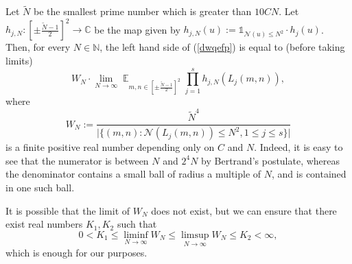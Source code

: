 \documentclass[11pt]{amsart}
\theoremstyle{definition}
\DeclareMathOperator*{\E}{\mathbb{E}}
\newcommand{\C}{{\mathbb C}}
\newcommand{\N}{{\mathbb N}}
\newcommand{\NN}{{\mathcal N}}
\begin{document}
Let $\tilde{N}$ be the smallest prime number which is greater than $10CN$.
Let $h_{j,N}\colon \left[\pm\frac{\tilde{N}-1}{2}\right]^{2}\to\C$ be the map given by $h_{j,N}(u):=\mathds{1}_{\NN(u)\leq N^{2}}\cdot h_{j}(u)$.
Then, for every $N \in \N$, the left hand side of (\ref{dwqefp}) is equal to (before taking limits)
    $$W_N\cdot \lim_{N \to \infty}\E_{m,n \in  \left[\pm\frac{\tilde{N}-1}{2}\right]^{2}} \prod_{j=1}^s h_{j,N}(L_j(m,n)),$$
where 
$$W_N:=\frac{\tilde{N}^{4}}{\vert\{(m,n)\colon \NN(L_{j}(m,n)) \leq  N^{2}, 1\leq j\leq s\}\vert}$$
is a finite positive real number depending only on $C$ and $N$. Indeed, it is easy to see that the numerator is between $N$ and $2^4N$ by Bertrand's postulate, whereas the denominator contains a small ball of radius a multiple of $N$, and is contained in one such ball. 

It is possible that the limit of $W_N$ does not exist, but we can ensure that there exist real numbers $K_1,K_2$ such that
\[
0<K_1 \leq \liminf_{N \to \infty} W_N \leq \limsup_{N \to \infty } W_N \leq K_2 <\infty,
\]
which is enough for our purposes.
\end{document}
